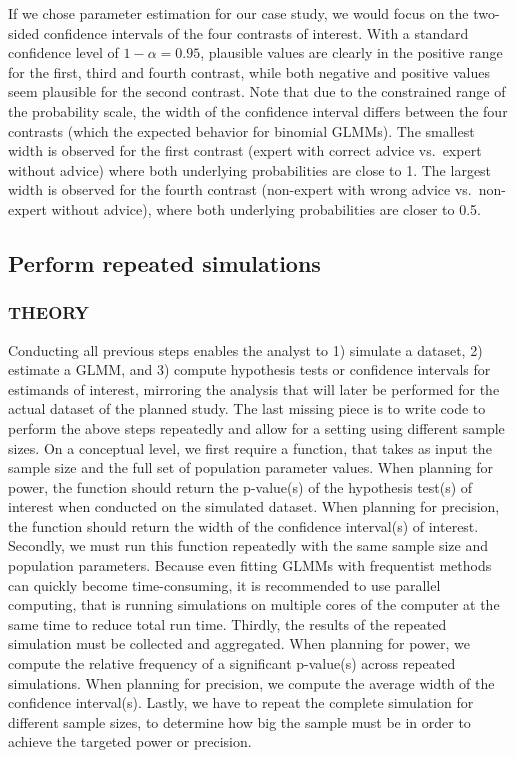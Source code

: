 \documentclass[
  man,floatsintext]{apa6}
\begin{document}
If we chose parameter estimation for our case study, we would focus on the two-sided confidence intervals of the four contrasts of interest.
With a standard confidence level of \(1 - \alpha = 0.95\), plausible values are clearly in the positive range for the first, third and fourth contrast, while both negative and positive values seem plausible for the second contrast.
Note that due to the constrained range of the probability scale, the width of the confidence interval differs between the four contrasts (which the expected behavior for binomial GLMMs).
The smallest width is observed for the first contrast (expert with correct advice vs.~expert without advice) where both underlying probabilities are close to 1.
The largest width is observed for the fourth contrast (non-expert with wrong advice vs.~non-expert without advice), where both underlying probabilities are closer to 0.5.

\hypertarget{perform-repeated-simulations}{%
\subsection{Perform repeated simulations}\label{perform-repeated-simulations}}

\hypertarget{theory-8}{%
\subsubsection{THEORY}\label{theory-8}}

Conducting all previous steps enables the analyst to 1) simulate a dataset, 2) estimate a GLMM, and 3) compute hypothesis tests or confidence intervals for estimands of interest, mirroring the analysis that will later be performed for the actual dataset of the planned study.
The last missing piece is to write code to perform the above steps repeatedly and allow for a setting using different sample sizes.
On a conceptual level, we first require a function, that takes as input the sample size and the full set of population parameter values.
When planning for power, the function should return the p-value(s) of the hypothesis test(s) of interest when conducted on the simulated dataset.
When planning for precision, the function should return the width of the confidence interval(s) of interest.
Secondly, we must run this function repeatedly with the same sample size and population parameters.
Because even fitting GLMMs with frequentist methods can quickly become time-consuming, it is recommended to use parallel computing, that is running simulations on multiple cores of the computer at the same time to reduce total run time.
Thirdly, the results of the repeated simulation must be collected and aggregated.
When planning for power, we compute the relative frequency of a significant p-value(s) across repeated simulations.
When planning for precision, we compute the average width of the confidence interval(s).
Lastly, we have to repeat the complete simulation for different sample sizes, to determine how big the sample must be in order to achieve the targeted power or precision.
\end{document}
